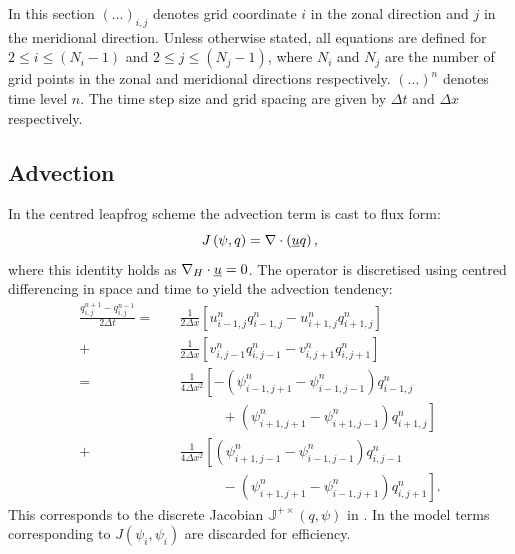 \documentclass[a4paper]{book}
\begin{document}
In this section $\left( \ldots \right)_{i,j}$ denotes grid coordinate $i$ in the
zonal direction and $j$ in the meridional direction. Unless otherwise stated,
all equations are defined for $2 \leq i \leq \left( N_i - 1 \right)$ and
$2 \leq j \leq \left( N_j - 1 \right)$, where $N_i$ and $N_j$ are the number of
grid points in the zonal and meridional directions respectively.
$\left( \ldots \right)^n$ denotes time level $n$. The time step size and
grid spacing are given by $\Delta t$ and $\Delta x$ respectively.

\subsection{Advection}\label{sect:cn_advection}

In the centred leapfrog scheme the advection term is cast to flux form:
\begin{equation}
  J \left( \psi, q \right) = \nabla \cdot \left( \uline{u} q \right),
\end{equation}
where this identity holds as $\nabla_H \cdot \uline{u} = 0$. The operator is
discretised using centred differencing in space and time to yield the advection
tendency:
\begin{align}\label{eqn:cn_advection}
  \frac{q^{n + 1}_{i,j} - q^{n - 1}_{i,j}}{2 \Delta t} = & \quad \frac{1}{2 \Delta x} \left[ u^n_{i - 1,j} q^n_{i - 1,j} - u^n_{i + 1,j} q^n_{i + 1,j} \right] \nonumber \\
                                                     + & \quad \frac{1}{2 \Delta x} \left[ v^n_{i,j - 1} q^n_{i,j - 1} - v^n_{i,j + 1} q^n_{i,j + 1} \right] \nonumber \\
                                                     = & \quad \frac{1}{4 \Delta x^2} \left[ -\left( \psi^n_{i - 1,j + 1} - \psi^n_{i - 1,j - 1} \right) q^n_{i - 1,j} \right. \nonumber \\
                                                       & \qquad \qquad + \left. \left( \psi^n_{i + 1,j + 1} - \psi^n_{i + 1,j - 1} \right) q^n_{i + 1,j} \right] \nonumber \\
                                                     + & \quad \frac{1}{4 \Delta x^2} \left[ \left( \psi^n_{i + 1,j - 1} - \psi^n_{i - 1,j - 1} \right) q^n_{i,j - 1} \right. \nonumber \\
                                                       & \qquad \qquad - \left. \left( \psi^n_{i + 1,j + 1} - \psi^n_{i - 1,j + 1} \right) q^n_{i,j + 1} \right].
\end{align}
This corresponds to the discrete Jacobian $\mathbb{J}^{+\times} \left( q, \psi \right)$ in
\citet{arakawa1966}. In the model terms corresponding to
$J \left( \psi_i, \psi_i \right)$ are discarded for efficiency.
\end{document}
